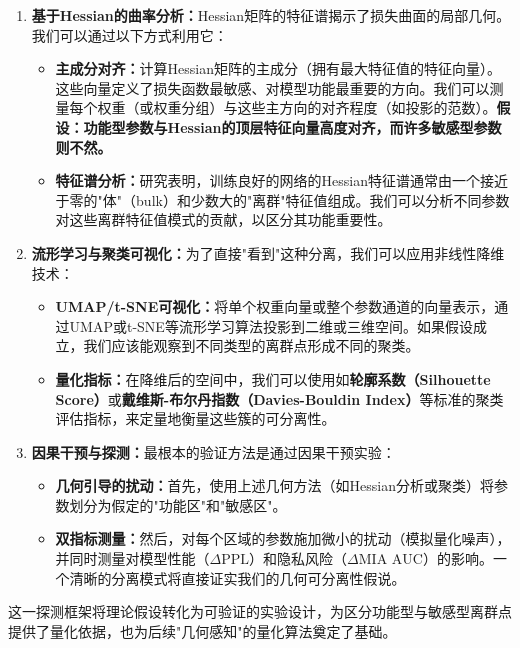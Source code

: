 \documentclass[letterpaper,twocolumn,10pt]{article}
\begin{document}
\begin{enumerate}
\item \textbf{基于Hessian的曲率分析：}Hessian矩阵的特征谱揭示了损失曲面的局部几何。我们可以通过以下方式利用它：
\begin{itemize}
\item \textbf{主成分对齐：}计算Hessian矩阵的主成分（拥有最大特征值的特征向量）。这些向量定义了损失函数最敏感、对模型功能最重要的方向。我们可以测量每个权重（或权重分组）与这些主方向的对齐程度（如投影的范数）。\textbf{假设：功能型参数与Hessian的顶层特征向量高度对齐，而许多敏感型参数则不然。}

\item \textbf{特征谱分析：}研究表明，训练良好的网络的Hessian特征谱通常由一个接近于零的"体"（bulk）和少数大的"离群"特征值组成。我们可以分析不同参数对这些离群特征值模式的贡献，以区分其功能重要性。
\end{itemize}

\item \textbf{流形学习与聚类可视化：}为了直接"看到"这种分离，我们可以应用非线性降维技术：
\begin{itemize}
\item \textbf{UMAP/t-SNE可视化：}将单个权重向量或整个参数通道的向量表示，通过UMAP或t-SNE等流形学习算法投影到二维或三维空间。如果假设成立，我们应该能观察到不同类型的离群点形成不同的聚类。

\item \textbf{量化指标：}在降维后的空间中，我们可以使用如\textbf{轮廓系数（Silhouette Score）}或\textbf{戴维斯-布尔丹指数（Davies-Bouldin Index）}等标准的聚类评估指标，来定量地衡量这些簇的可分离性。
\end{itemize}

\item \textbf{因果干预与探测：}最根本的验证方法是通过因果干预实验：
\begin{itemize}
\item \textbf{几何引导的扰动：}首先，使用上述几何方法（如Hessian分析或聚类）将参数划分为假定的"功能区"和"敏感区"。

\item \textbf{双指标测量：}然后，对每个区域的参数施加微小的扰动（模拟量化噪声），并同时测量对模型性能（$\Delta \text{PPL}$）和隐私风险（$\Delta \text{MIA AUC}$）的影响。一个清晰的分离模式将直接证实我们的几何可分离性假说。
\end{itemize}
\end{enumerate}

这一探测框架将理论假设转化为可验证的实验设计，为区分功能型与敏感型离群点提供了量化依据，也为后续"几何感知"的量化算法奠定了基础。
\end{document}
